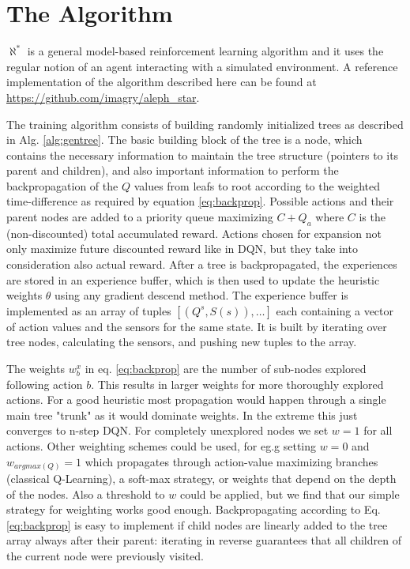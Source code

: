 \documentclass{article}
\newcommand{\alephstar}{$\aleph^*$ }
\begin{document}
\section{The Algorithm}
\label{sec:algorithm}

\alephstar is a general model-based reinforcement learning algorithm and it uses the regular notion of an agent interacting with a simulated environment. A reference implementation of the algorithm described here can be found at \url{https://github.com/imagry/aleph_star}.

The training algorithm consists of building randomly initialized trees as described in Alg. \ref{alg:gentree}. The basic building block of the tree is a node, which contains the necessary information to maintain the tree structure (pointers to its parent and children), and also important information to perform the backpropagation of the $Q$ values from leafs to root according to the weighted time-difference as required by equation \ref{eq:backprop}. Possible actions and their parent nodes are added to a priority queue maximizing $C+Q_a$ where $C$ is the (non-discounted) total accumulated reward. Actions chosen for expansion not only maximize future discounted reward like in DQN, but they take into consideration also actual reward. After a tree is backpropagated, the experiences are stored in an experience buffer, which is then used to update the heuristic weights $\theta$ using any gradient descend method. The experience buffer is implemented as an array of tuples $[(Q^s, S(s)), \ldots]$ each containing a vector of action values and the sensors for the same state. It is built by iterating over tree nodes, calculating the sensors, and pushing new tuples to the array.

The weights $w^x_b$ in eq. \ref{eq:backprop} are the number of sub-nodes explored following action $b$. This results in larger weights for more thoroughly explored actions. For a good heuristic most propagation would happen through a single main tree "trunk" as it would dominate weights. In the extreme this just converges to n-step DQN. For completely unexplored nodes we set $w=1$ for all actions. Other weighting schemes could be used, for eg.g setting $w=0$ and $w_{argmax(Q)}=1$ which propagates through action-value maximizing branches (classical Q-Learning), a soft-max strategy, or weights that depend on the depth of the nodes. Also a threshold to $w$ could be applied, but we find that our simple strategy for weighting works good enough. Backpropagating according to Eq. \ref{eq:backprop} is easy to implement if child nodes are linearly added to the tree array always after their parent: iterating in reverse guarantees that all children of the current node were previously visited.
\end{document}
